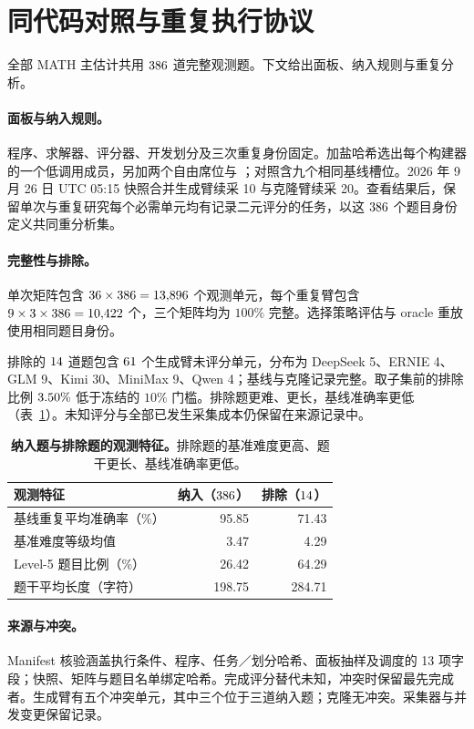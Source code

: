 \section{同代码对照与重复执行协议}\label{app:wp1r}
全部 MATH 主估计共用 $386$ 道完整观测题。下文给出面板、纳入规则与重复分析。

\paragraph{面板与纳入规则。}
程序、求解器、评分器、开发划分及三次重复身份固定。加盐哈希选出每个构建器的一个低调用成员，另加两个自由席位与 \bare{}；对照含九个相同基线槽位。2026 年 9 月 26 日 UTC 05:15 快照合并生成臂续采 10 与克隆臂续采 20。查看结果后，保留单次与重复研究每个必需单元均有记录二元评分的任务，以这 $386$ 个题目身份定义共同重分析集。

\paragraph{完整性与排除。}
单次矩阵包含 $36\times386=13{,}896$ 个观测单元，每个重复臂包含 $9\times3\times386=10{,}422$ 个，三个矩阵均为 $100\%$ 完整。选择策略评估与 oracle 重放使用相同题目身份。

排除的 $14$ 道题包含 $61$ 个生成臂未评分单元，分布为 DeepSeek 5、ERNIE 4、GLM 9、Kimi 30、MiniMax 9、Qwen 4；基线与克隆记录完整。取子集前的排除比例 $3.50\%$ 低于冻结的 $10\%$ 门槛。排除题更难、更长，基线准确率更低（表~\ref{tab:complete-subset}）。未知评分与全部已发生采集成本仍保留在来源记录中。

\begin{table}[H]
\centering\small
\begin{tabular}{@{}lrr@{}}
\toprule
观测特征 & 纳入（$386$） & 排除（$14$） \\
\midrule
基线重复平均准确率（\%） & 95.85 & 71.43 \\
基准难度等级均值 & 3.47 & 4.29 \\
Level-5 题目比例（\%） & 26.42 & 64.29 \\
题干平均长度（字符） & 198.75 & 284.71 \\
\bottomrule
\end{tabular}
\caption{\textbf{纳入题与排除题的观测特征。}排除题的基准难度更高、题干更长、基线准确率更低。}
\label{tab:complete-subset}
\end{table}

\paragraph{来源与冲突。}
Manifest 核验涵盖执行条件、程序、任务／划分哈希、面板抽样及调度的 13 项字段；快照、矩阵与题目名单绑定哈希。完成评分替代未知，冲突时保留最先完成者。生成臂有五个冲突单元，其中三个位于三道纳入题；克隆无冲突。采集器与并发变更保留记录。

